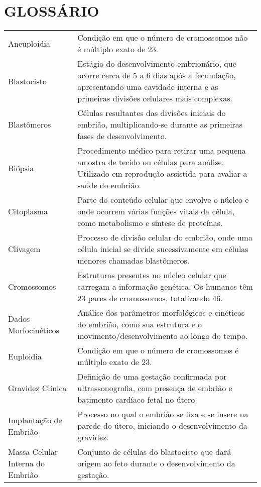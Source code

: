 \chapter*{GLOSSÁRIO}

\begin{flushleft}

\begin{tabularx}{\textwidth}{p{4.5cm} X} %
    Aneuploidia & Condição em que o número de cromossomos não é múltiplo exato de 23. \\
    Blastocisto & Estágio do desenvolvimento embrionário, que ocorre cerca de 5 a 6 dias após a fecundação, apresentando uma cavidade interna e as primeiras divisões celulares mais complexas. \\
    Blastômeros & Células resultantes das divisões iniciais do embrião, multiplicando-se durante as primeiras fases de desenvolvimento. \\
    Biópsia & Procedimento médico para retirar uma pequena amostra de tecido ou células para análise. Utilizado em reprodução assistida para avaliar a saúde do embrião. \\
    Citoplasma & Parte do conteúdo celular que envolve o núcleo e onde ocorrem várias funções vitais da célula, como metabolismo e síntese de proteínas. \\
    Clivagem & Processo de divisão celular do embrião, onde uma célula inicial se divide sucessivamente em células menores chamadas blastômeros. \\
    Cromossomos & Estruturas presentes no núcleo celular que carregam a informação genética. Os humanos têm 23 pares de cromossomos, totalizando 46. \\
    Dados Morfocinéticos & Análise dos parâmetros morfológicos e cinéticos do embrião, como sua estrutura e o movimento/desenvolvimento ao longo do tempo. \\
    Euploidia & Condição em que o número de cromossomos é múltiplo exato de 23. \\
    Gravidez Clínica & Definição de uma gestação confirmada por ultrassonografia, com presença de embrião e batimento cardíaco fetal no útero. \\
    Implantação de Embrião & Processo no qual o embrião se fixa e se insere na parede do útero, iniciando o desenvolvimento da gravidez. \\
    Massa Celular Interna do Embrião & Conjunto de células do blastocisto que dará origem ao feto durante o desenvolvimento da gestação. \\
\end{tabularx}


\end{flushleft}
